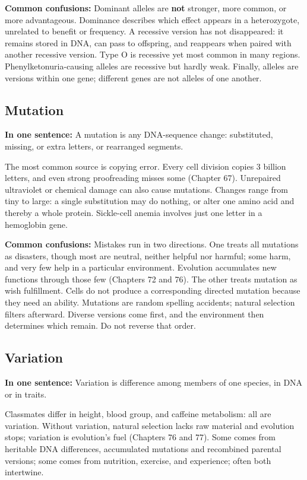\textbf{Common confusions:} Dominant alleles are \textbf{not} stronger, more common, or more advantageous. Dominance describes which effect appears in a heterozygote, unrelated to benefit or frequency. A recessive version has not disappeared: it remains stored in DNA, can pass to offspring, and reappears when paired with another recessive version. Type O is recessive yet most common in many regions. Phenylketonuria-causing alleles are recessive but hardly weak. Finally, alleles are versions within one gene; different genes are not alleles of one another.

\subsection{Mutation}

\textbf{In one sentence:} A mutation is any DNA-sequence change: substituted, missing, or extra letters, or rearranged segments.

The most common source is copying error. Every cell division copies 3 billion letters, and even strong proofreading misses some (Chapter 67). Unrepaired ultraviolet or chemical damage can also cause mutations. Changes range from tiny to large: a single substitution may do nothing, or alter one amino acid and thereby a whole protein. Sickle-cell anemia involves just one letter in a hemoglobin gene.

\textbf{Common confusions:} Mistakes run in two directions. One treats all mutations as disasters, though most are neutral, neither helpful nor harmful; some harm, and very few help in a particular environment. Evolution accumulates new functions through those few (Chapters 72 and 76). The other treats mutation as wish fulfillment. Cells do not produce a corresponding directed mutation because they need an ability. Mutations are random spelling accidents; natural selection filters afterward. Diverse versions come first, and the environment then determines which remain. Do not reverse that order.

\subsection{Variation}

\textbf{In one sentence:} Variation is difference among members of one species, in DNA or in traits.

Classmates differ in height, blood group, and caffeine metabolism: all are variation. Without variation, natural selection lacks raw material and evolution stops; variation is evolution's fuel (Chapters 76 and 77). Some comes from heritable DNA differences, accumulated mutations and recombined parental versions; some comes from nutrition, exercise, and experience; often both intertwine.

